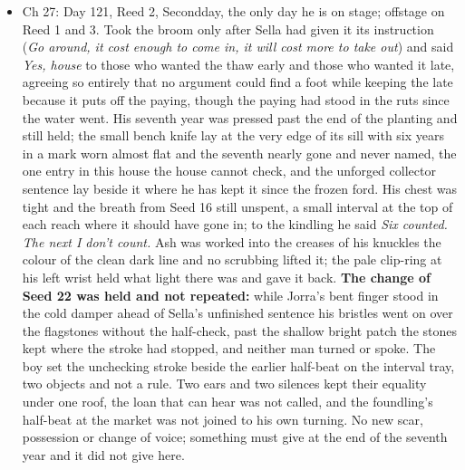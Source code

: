 \documentclass{design/chronicle}
\begin{document}
{\begin{itemize}[leftmargin=1.4em,itemsep=1pt,topsep=3pt,parsep=0pt]
\item Ch 27: Day 121, Reed 2, Secondday, the only day he is on stage; offstage on Reed 1 and 3. Took the broom only after Sella had given it its instruction (\emph{Go around, it cost enough to come in, it will cost more to take out}) and said \emph{Yes, house} to those who wanted the thaw early and those who wanted it late, agreeing so entirely that no argument could find a foot while keeping the late because it puts off the paying, though the paying had stood in the ruts since the water went. His seventh year was pressed past the end of the planting and still held; the small bench knife lay at the very edge of its sill with six years in a mark worn almost flat and the seventh nearly gone and never named, the one entry in this house the house cannot check, and the unforged collector sentence lay beside it where he has kept it since the frozen ford. His chest was tight and the breath from Seed 16 still unspent, a small interval at the top of each reach where it should have gone in; to the kindling he said \emph{Six counted. The next I don’t count.} Ash was worked into the creases of his knuckles the colour of the clean dark line and no scrubbing lifted it; the pale clip-ring at his left wrist held what light there was and gave it back. \textbf{The change of Seed 22 was held and not repeated:} while Jorra’s bent finger stood in the cold damper ahead of Sella’s unfinished sentence his bristles went on over the flagstones without the half-check, past the shallow bright patch the stones kept where the stroke had stopped, and neither man turned or spoke. The boy set the unchecking stroke beside the earlier half-beat on the interval tray, two objects and not a rule. Two ears and two silences kept their equality under one roof, the loan that can hear was not called, and the foundling’s half-beat at the market was not joined to his own turning. No new scar, possession or change of voice; something must give at the end of the seventh year and it did not give here.

\end{itemize}

\begin{itemize}[leftmargin=1.4em,itemsep=1pt,topsep=3pt,parsep=0pt]


\end{itemize}}
\end{document}
